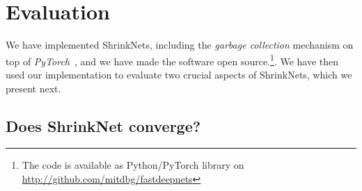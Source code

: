 \documentclass[sigconf]{acmart}
\newcommand{\gl}[1]{\textcolor{violet}{{\bf Gl:} #1}}
\begin{document}
\section{Evaluation}

We have implemented ShrinkNets, including the \emph{garbage collection}
mechanism on top of \textit{PyTorch}~\cite{paszke2017automatic}, and we have
made the software open source.\footnote{The code is available as Python/PyTorch
library on \url{http://github.com/mitdbg/fastdeepnets} 
}. We have then used our implementation to evaluate two crucial aspects of
ShrinkNets, which we present next.


%


\subsection{Does ShrinkNet converge?}
\end{document}
